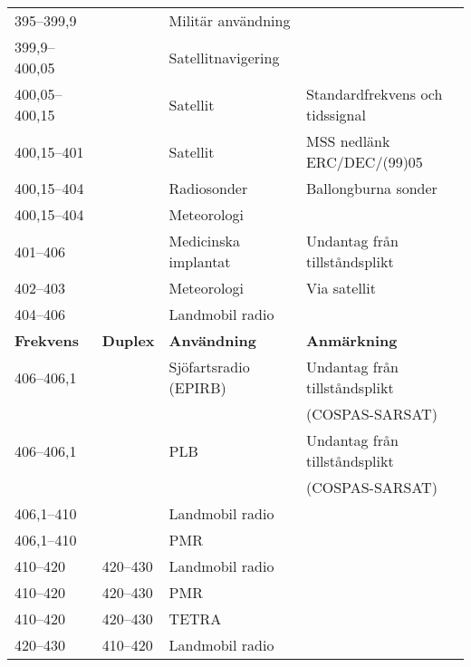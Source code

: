 \documentclass[10pt,swedish,a4paper,twoside]{article}
\begin{document}
\begin{landscape}
\begin{longtable}{llll}
	395--399,9         &                    & Militär användning      &  \\
	399,9--400,05      &                    & Satellitnavigering      &  \\
	400,05--400,15     &                    & Satellit                & Standardfrekvens och tidssignal          \\
	400,15--401        &                    & Satellit                & MSS nedlänk ERC/DEC/(99)05               \\
	400,15--404        &                    & Radiosonder             & Ballongburna sonder                      \\
	400,15--404        &                    & Meteorologi             &  \\
	401--406           &                    & Medicinska implantat    & Undantag från tillståndsplikt            \\
	402--403           &                    & Meteorologi             & Via satellit                             \\
	404--406           &                    & Landmobil radio         &  \\
	\textbf{Frekvens}  & \textbf{Duplex}    & \textbf{Användning}     & \textbf{Anmärkning}                      \\ \hline
	406--406,1         &                    & Sjöfartsradio (EPIRB)   & Undantag från tillståndsplikt            \\
	                   &                    &                         & (COSPAS-SARSAT)                          \\
	406--406,1         &                    & PLB                     & Undantag från tillståndsplikt            \\
	                   &                    &                         & (COSPAS-SARSAT)                          \\
	406,1--410         &                    & Landmobil radio         &  \\
	406,1--410         &                    & PMR                     &  \\
	410--420           & 420--430           & Landmobil radio         &  \\
	410--420           & 420--430           & PMR                     &  \\
	410--420           & 420--430           & TETRA                   &  \\
	420--430           & 410--420           & Landmobil radio         &  \\

\end{longtable}
\end{landscape}
\end{document}
